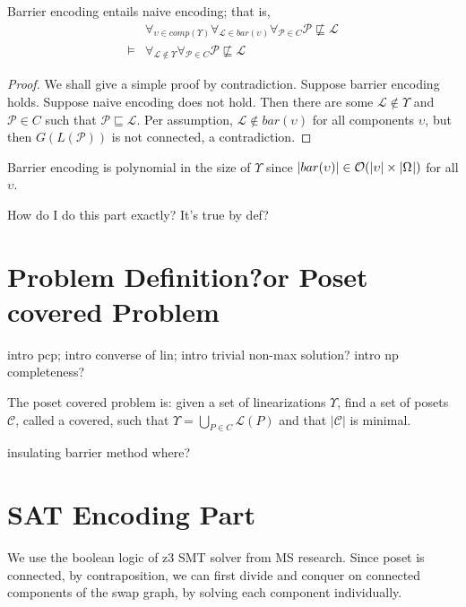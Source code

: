 \documentclass[12pt]{llncs}
\DeclarePairedDelimiter{\abs}{\lvert}{\rvert}
\newcommand{\poset}[1]{\mathcal{#1}}
\newcommand{\uni}[1][]{\Omega_{#1}}
\newcommand{\lang}[1]{L(#1)}
\newcommand{\sgraph}[1]{G(#1)}
\newcommand{\lext}{\sqsubseteq}
\newcommand{\bigo}[1]{\mathcal{O}(#1)}
\begin{document}
\begin{proposition}
    Barrier encoding entails naive encoding; that is,
    \begin{align*}
        & \forall_{\upsilon \in comp(\Upsilon)} \forall_{\poset{L} \in bar(\upsilon)} \forall_{\poset{P} \in C} \poset{P} \not\lext \poset{L}\\
        \models & \forall_{\poset{L} \not\in \Upsilon} \forall_{\poset{P} \in C} \poset{P} \not\lext \poset{L}
    \end{align*}
\end{proposition}
\begin{proof}
    We shall give a simple proof by contradiction. Suppose barrier encoding holds. Suppose naive encoding does not hold. Then there are some $\poset{L} \not\in \Upsilon$ and $\poset{P} \in C$ such that $\poset{P} \lext \poset{L}$. Per assumption, $\poset{L} \not\in bar(\upsilon)$ for all components $\upsilon$, but then $\sgraph{\lang{\poset{P}}}$ is not connected, a contradiction.
\end{proof}

Barrier encoding is polynomial in the size of $\Upsilon$ since $\abs{bar(\upsilon)} \in \bigo{\abs{\upsilon} \times \abs{\uni}}$ for all $\upsilon$.

How do I do this part exactly? It's true by def?


\section{Problem Definition?or Poset covered Problem}
intro pcp; intro converse of lin; intro trivial non-max solution? intro np completeness?

The poset covered problem is: given a set of linearizations $\Upsilon$, find a set of posets $\mathcal{C}$, called a covered, such that $\Upsilon = \bigcup_{P \in C} \mathcal{L}(P)$ and that $|\mathcal{C}|$ is minimal.

\begin{theorem}
    insulating barrier method where?
\end{theorem}

\section{SAT Encoding Part}
We use the boolean logic of z3 SMT solver from MS research. Since poset is connected, by contraposition, we can first divide and conquer on connected components of the swap graph, by solving each component individually.
\end{document}
